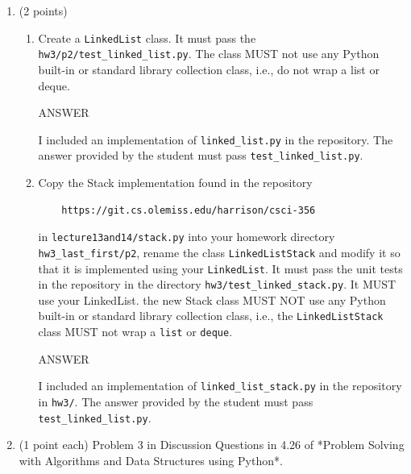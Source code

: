\documentclass{article} %
\newenvironment{mpage}
  {\hspace{0.1in}
   \begin{minipage}{4.5in}
     \setlength{\parskip}{.5em}
     \vspace{0.1in}}    
  {\vspace{0.1in}
   \end{minipage}}
\begin{document}
\begin{enumerate}
\begin{enumerate}
  \end{enumerate}

\item (2 points)

  \begin{enumerate}
    \item Create a \verb|LinkedList| class.  It must pass the
      \verb|hw3/p2/test_linked_list.py|.  The class MUST not use any
      Python built-in or standard library collection class, i.e., do
      not wrap a list or deque.
  
      \begin{mpage}
        ANSWER

        I included an implementation of \verb|linked_list.py| in the
        repository.  The answer provided by the student must pass
        \verb|test_linked_list.py|.
        \vspace{.1in}
      \end{mpage}

  \item   Copy the Stack implementation found in the
  repository

  \begin{verbatim}
    https://git.cs.olemiss.edu/harrison/csci-356
  \end{verbatim}

  in \verb|lecture13and14/stack.py| into your homework directory
  \verb|hw3_last_first/p2|, rename the class \verb|LinkedListStack|
  and modify it so that it is implemented using your \verb|LinkedList|. It
  must pass the unit tests in the repository in the directory
  \verb|hw3/test_linked_stack.py|.  It MUST use your LinkedList.  the
  new Stack class MUST NOT use any Python built-in or standard library
  collection class, i.e., the \verb|LinkedListStack| class MUST not wrap a
  \verb|list| or \verb|deque|.

      \begin{mpage}
        ANSWER

        I included an implementation of \verb|linked_list_stack.py| in
        the repository in \verb|hw3/|.  The answer provided by the
        student must pass \verb|test_linked_list.py|.
        \vspace{.1in}
      \end{mpage}

      
  \end{enumerate} 

\item (1 point each)
  Problem 3 in Discussion Questions in 4.26 of *Problem Solving with
  Algorithms and Data Structures using Python*. 


\end{enumerate}
\end{document}
